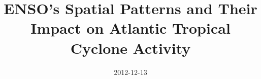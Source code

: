 \documentclass[]{article}
\title{ENSO's Spatial Patterns and Their Impact on Atlantic Tropical Cyclone Activity}
\date{2012-12-13}
\begin{document}
\maketitle






%
%
%

\end{document}
